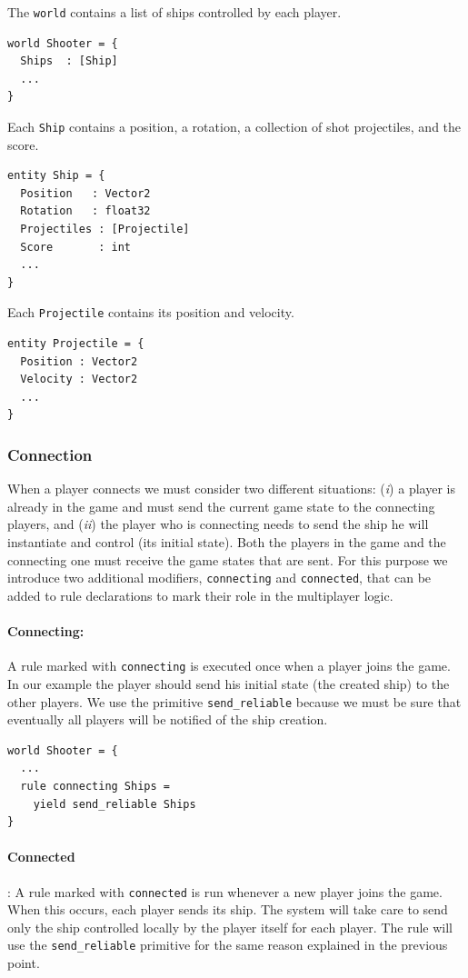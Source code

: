 The \texttt{world} contains a list of ships controlled by each player.
\begin{lstlisting}
world Shooter = {
  Ships  : [Ship]
  ...
}
\end{lstlisting}

Each \texttt{Ship} contains a position, a rotation, a collection of shot projectiles, and the score.
\begin{lstlisting}
entity Ship = {
  Position   : Vector2
  Rotation   : float32
  Projectiles : [Projectile]
  Score		  : int
  ...
}

\end{lstlisting}

Each \texttt{Projectile} contains its position and velocity.

\begin{lstlisting}
entity Projectile = {
  Position : Vector2
  Velocity : Vector2
  ...
}
\end{lstlisting}

\subsubsection{Connection}
When a player connects we must consider two different situations: (\textit{i}) a player is already in the game and must send the current game state to the connecting players, and (\textit{ii}) the player who is connecting needs to send the ship he will instantiate and control (its initial state). Both the players in the game and the connecting one must receive the game states that are sent. For this purpose we introduce two additional modifiers, \texttt{connecting} and \texttt{connected}, that can be added to rule declarations to mark their role in the multiplayer logic.

\paragraph{Connecting:} A rule marked with \texttt{connecting} is executed once when a player joins the game. In our example the player should send his initial state (the created ship) to the other players. We use the primitive \texttt{send\_reliable} because we must be sure that eventually all players will be notified of the ship creation.
	\begin{lstlisting}
world Shooter = {
  ...
  rule connecting Ships =
    yield send_reliable Ships
}
	\end{lstlisting}
	
\paragraph{Connected}: A rule marked with \texttt{connected} is run whenever a new player joins the game. When this occurs, each player sends its ship. The system will take care to send only the ship controlled locally by the player itself for each player. The rule will use the \texttt{send\_reliable} primitive for the same reason explained in the previous point.

